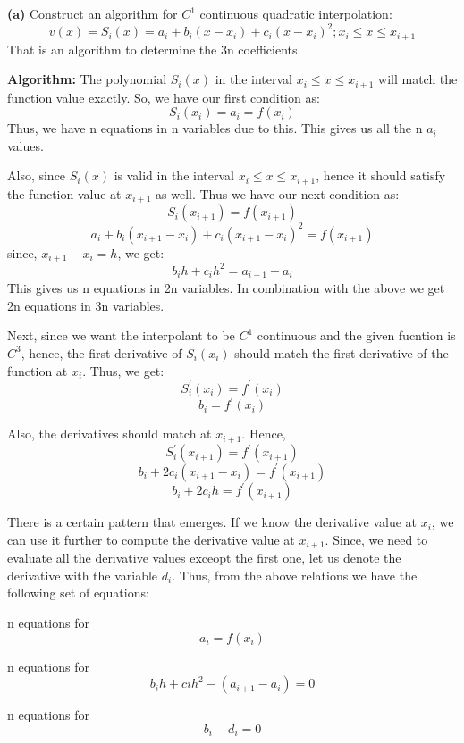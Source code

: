\documentclass{article}
\renewcommand\part[1]{\vspace{.10in}\textbf{(#1)}}
\newcommand\algo{\vspace{.10in}\textbf{Algorithm: }}
\begin{document}
\part{a} Construct an algorithm for $C^1$ continuous quadratic interpolation: \newline
\[ v(x) = S_i(x) = a_i + b_i(x - x_i) + c_i(x - x_i)^2 ; x_i \leq x \leq x_{i+1}\]
That is an algorithm to determine the 3n coefficients. \newline

\algo
 The polynomial $S_i(x)$ in the interval $x_i \leq x \leq x_{i+1}$ will match the function value exactly. So, we have our first condition as:
	\[S_i(x_i) = a_i = f(x_i) \]
Thus, we have n equations in n variables due to this.
This gives us all the n $a_i$ values. \newline

Also, since $S_i(x)$ is valid in the interval $x_i \leq x \leq x_{i+1}$, hence it should satisfy the function value at $x_{i+1}$ as well. Thus we have our next condition as: 
\[ S_i(x_{i+1}) = f(x_{i+1}) \]
\[ a_i + b_i(x_{i+1} - x_i) + c_i(x_{i+1} - x_i)^2 = f(x_{i+1})\]
since, $x_{i+1} - x_i = h$, we get:
\[ b_i h + c_i h^2 = a_{i+1} - a_i\]
This gives us n equations in 2n variables. In combination with the above we get 2n equations in 3n variables. \newline

Next, since we want the interpolant to be $C^1$ continuous and the given fucntion is $C^3$, hence, the first derivative of $S_i(x_i)$ should match the first derivative of the function at $x_i$. Thus, we get: 
\[ S_{i}^\prime(x_i) = f^\prime(x_i) \]
\[ b_i = f^\prime(x_i)\]

Also, the derivatives should match at $x_{i+1}$. Hence, 
\[ S_i^\prime(x_{i+1}) = f^\prime(x_{i+1})\]
\[ b_i + 2c_i(x_{i+1} - x_i) = f^\prime(x_{i+1})\]
\[ b_i + 2c_i h = f^\prime(x_{i+1})\]

There is a certain pattern that emerges. If we know the derivative value at $x_i$, we can use it further to compute the derivative value at $x_{i+1}$. Since, we need to evaluate all the derivative values exceopt the first one, let us denote the derivative with the variable $d_i$. \newline
Thus, from the above relations we have the following set of equations:

n equations for
\[ a_i = f(x_i)\]

n equations for
\[ b_i h + ci h^2 - (a_{i+1} - a_i) = 0\]

n equations for 
\[ b_i - d_i = 0\]
\end{document}
